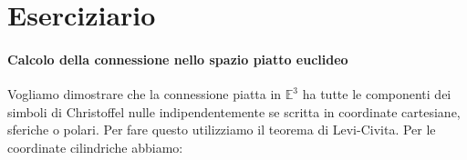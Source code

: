 \documentclass[twoside]{article}
\begin{document}
\section{Eserciziario}
\paragraph{Calcolo della connessione nello spazio piatto euclideo}
Vogliamo dimostrare che la connessione piatta in $\mathbb{E}^3$ ha tutte le componenti dei simboli di Christoffel nulle indipendentemente se scritta in coordinate cartesiane, sferiche o polari. Per fare questo utilizziamo il teorema di Levi-Civita. Per le coordinate cilindriche abbiamo:

% 



\end{document}
